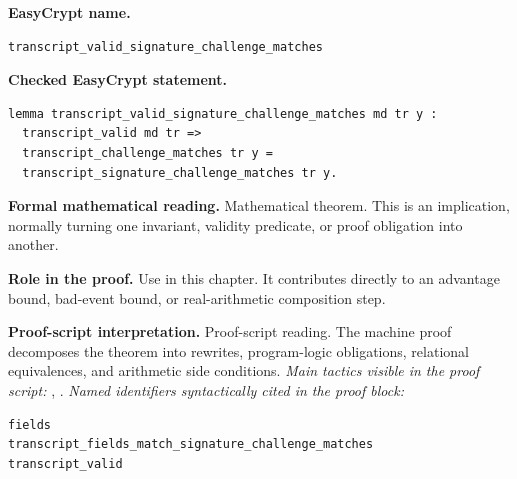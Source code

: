 \begin{formaltheorem}
\noindent\textbf{EasyCrypt name.}
\begin{lstlisting}[language=EasyCrypt,basicstyle=\ttfamily\scriptsize]
transcript_valid_signature_challenge_matches
\end{lstlisting}
\noindent\textbf{Checked EasyCrypt statement.}
\begin{lstlisting}[language=EasyCrypt,basicstyle=\ttfamily\scriptsize]
lemma transcript_valid_signature_challenge_matches md tr y :
  transcript_valid md tr =>
  transcript_challenge_matches tr y =
  transcript_signature_challenge_matches tr y.
\end{lstlisting}
\noindent\textbf{Formal mathematical reading.}
Mathematical theorem. This is an implication, normally turning one invariant, validity predicate, or proof obligation into another.

\noindent\textbf{Role in the proof.}
Use in this chapter. It contributes directly to an advantage bound, bad-event bound, or real-arithmetic composition step.

\noindent\textbf{Proof-script interpretation.}
Proof-script reading. The machine proof decomposes the theorem into rewrites, program-logic obligations, relational equivalences, and arithmetic side conditions.
\emph{Main tactics visible in the proof script:} , .
\emph{Named identifiers syntactically cited in the proof block:}
\begin{lstlisting}[language=EasyCrypt,basicstyle=\ttfamily\scriptsize]
fields
transcript_fields_match_signature_challenge_matches
transcript_valid
\end{lstlisting}

\end{formaltheorem}

